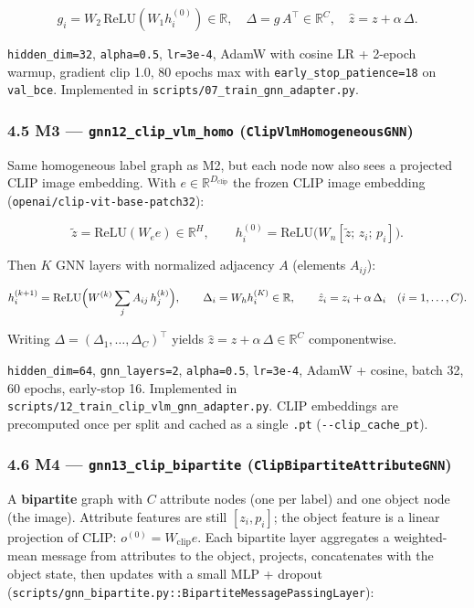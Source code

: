 \documentclass[
  11pt,
]{article}
\begin{document}
\[g_i=W_2\,\mathrm{ReLU}(W_1 h^{(0)}_i)\in\mathbb{R},
\quad
\Delta = g\,A^\top\in\mathbb{R}^{C},
\quad
\hat z=z+\alpha\,\Delta.\]

\texttt{hidden\_dim=32}, \texttt{alpha=0.5}, \texttt{lr=3e-4}, AdamW
with cosine LR + 2-epoch warmup, gradient clip 1.0, 80 epochs max with
\texttt{early\_stop\_patience=18} on \texttt{val\_bce}. Implemented in
\texttt{scripts/07\_train\_gnn\_adapter.py}.

\subsubsection{\texorpdfstring{4.5 M3 ---
\texttt{gnn12\_clip\_vlm\_homo}
(\texttt{ClipVlmHomogeneousGNN})}{4.5 M3 --- gnn12\_clip\_vlm\_homo (ClipVlmHomogeneousGNN)}}\label{m3-gnn12_clip_vlm_homo-clipvlmhomogeneousgnn}

Same homogeneous label graph as M2, but each node now also sees a
projected CLIP image embedding. With
\(e\in\mathbb{R}^{D_{\text{clip}}}\) the frozen CLIP image embedding
(\texttt{openai/clip-vit-base-patch32}):

\[\tilde z=\mathrm{ReLU}(W_e e)\in\mathbb{R}^{H},\qquad
h^{(0)}_i=\mathrm{ReLU}\bigl(W_n[\tilde z;\,z_i;\,p_i]\bigr).\]

Then \(K\) GNN layers with normalized adjacency \(A\) (elements
\(A_{ij}\)):

\[h^{(k+1)}_i=\mathrm{ReLU}\Bigl(W^{(k)}\sum_{j} A_{ij}\,h^{(k)}_j\Bigr),
\qquad
\Delta_i=W_h h^{(K)}_i\in\mathbb{R},
\qquad
\hat z_i=z_i+\alpha\,\Delta_i\quad (i=1,\ldots,C).\]

Writing \(\Delta=(\Delta_1,\ldots,\Delta_C)^\top\) yields
\(\hat z=z+\alpha\,\Delta\in\mathbb{R}^C\) componentwise.

\texttt{hidden\_dim=64}, \texttt{gnn\_layers=2}, \texttt{alpha=0.5},
\texttt{lr=3e-4}, AdamW + cosine, batch 32, 60 epochs, early-stop 16.
Implemented in \texttt{scripts/12\_train\_clip\_vlm\_gnn\_adapter.py}.
CLIP embeddings are precomputed once per split and cached as a single
\texttt{.pt} (\texttt{-\/-clip\_cache\_pt}).

\subsubsection{\texorpdfstring{4.6 M4 ---
\texttt{gnn13\_clip\_bipartite}
(\texttt{ClipBipartiteAttributeGNN})}{4.6 M4 --- gnn13\_clip\_bipartite (ClipBipartiteAttributeGNN)}}\label{m4-gnn13_clip_bipartite-clipbipartiteattributegnn}

A \textbf{bipartite} graph with \(C\) attribute nodes (one per label)
and one object node (the image). Attribute features are still
\([z_i, p_i]\); the object feature is a linear projection of CLIP:
\(o^{(0)}=W_{\text{clip}} e\). Each bipartite layer aggregates a
weighted-mean message from attributes to the object, projects,
concatenates with the object state, then updates with a small MLP +
dropout
(\texttt{scripts/gnn\_bipartite.py::BipartiteMessagePassingLayer}):
\end{document}
